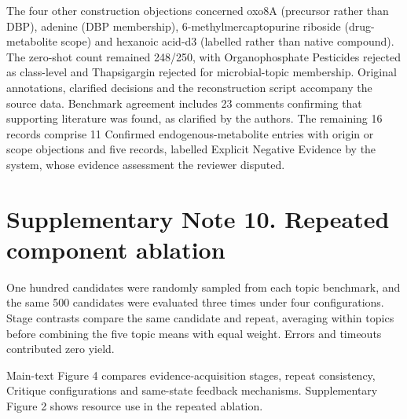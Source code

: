 \documentclass[10pt]{article}
\begin{document}
The four other construction objections concerned oxo8A (precursor rather than DBP), adenine (DBP membership), 6-methylmercaptopurine riboside (drug-metabolite scope) and hexanoic acid-d3 (labelled rather than native compound). The zero-shot count remained 248/250, with Organophosphate Pesticides rejected as class-level and Thapsigargin rejected for microbial-topic membership. Original annotations, clarified decisions and the reconstruction script accompany the source data. Benchmark agreement includes 23 comments confirming that supporting literature was found, as clarified by the authors. The remaining 16 records comprise 11 Confirmed endogenous-metabolite entries with origin or scope objections and five records, labelled Explicit Negative Evidence by the system, whose evidence assessment the reviewer disputed.

\section*{Supplementary Note 10. Repeated component ablation}

One hundred candidates were randomly sampled from each topic benchmark, and the same 500 candidates were evaluated three times under four configurations. Stage contrasts compare the same candidate and repeat, averaging within topics before combining the five topic means with equal weight. Errors and timeouts contributed zero yield.

Main-text Figure 4 compares evidence-acquisition stages, repeat consistency, Critique configurations and same-state feedback mechanisms. Supplementary Figure 2 shows resource use in the repeated ablation.
\end{document}
